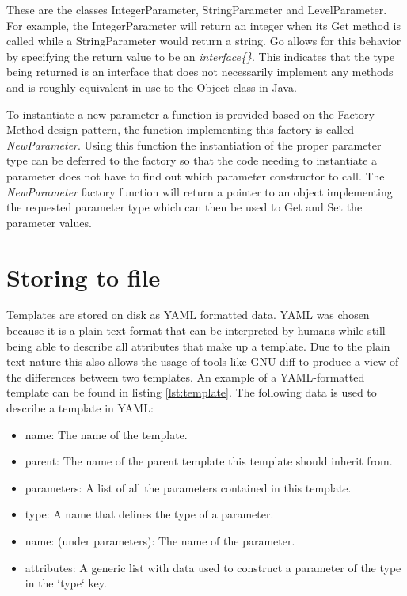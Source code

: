 These are the classes IntegerParameter, StringParameter and LevelParameter.
For example, the IntegerParameter will return an integer when its Get method is called while a StringParameter would return a string.
Go allows for this behavior by specifying the return value to be an \textit{interface\{\}}.
This indicates that the type being returned is an interface that does not necessarily implement any methods and is roughly equivalent in use to the Object class in Java.

To instantiate a new parameter a function is provided based on the Factory Method design pattern, the function implementing this factory is called \textit{NewParameter}.
Using this function the instantiation of the proper parameter type can be deferred to the factory so that the code needing to instantiate a parameter does not have to find out which parameter constructor to call.
The \textit{NewParameter} factory function will return a pointer to an object implementing the requested parameter type which can then be used to Get and Set the parameter values.

\section{Storing to file}
Templates are stored on disk as YAML formatted data. YAML was chosen because it is a plain text format that can be interpreted by humans while still being able to describe all attributes that make up a template. 
Due to the plain text nature this also allows the usage of tools like GNU diff to produce a view of the differences between two templates.
An example of a YAML-formatted template can be found in listing \ref{lst:template}.
The following data is used to describe a template in YAML:
\begin{itemize}
	\item name: The name of the template.
	\item parent: The name of the parent template this template should inherit from.
	\item parameters: A list of all the parameters contained in this template.
	\item type: A name that defines the type of a parameter.
	\item name: (under parameters): The name of the parameter.
	\item attributes: A generic list with data used to construct a parameter of the type in the `type` key.
\end{itemize}


